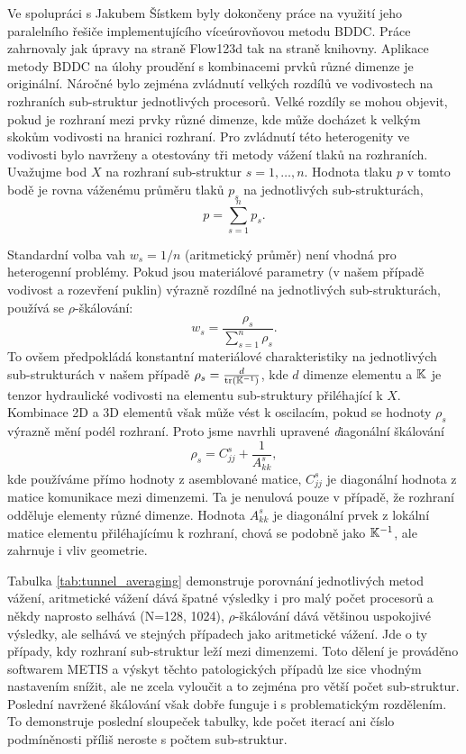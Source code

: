 Ve spolupráci s Jakubem Šístkem byly dokončeny práce na využití jeho 
paralelního řešiče implementujícího víceúrovňovou metodu BDDC. Práce zahrnovaly 
jak úpravy na straně Flow123d tak na straně knihovny. Aplikace metody BDDC na 
úlohy proudění s kombinacemi prvků různé dimenze je originální. Náročné bylo 
zejména zvládnutí velkých rozdílů ve vodivostech na rozhraních sub-struktur 
jednotlivých procesorů. Velké rozdíly se mohou objevit, pokud je rozhraní mezi 
prvky různé dimenze, kde může docházet k velkým skokům vodivosti na hranici 
rozhraní. Pro zvládnutí této heterogenity ve vodivosti bylo navrženy a 
otestovány tři metody vážení tlaků na rozhraních. Uvažujme bod $X$ na rozhraní 
sub-struktur $s=1,\dots,n$. Hodnota tlaku $p$ v tomto bodě je rovna váženému 
průměru tlaků $p_s$ na jednotlivých sub-strukturách, 
\[
    p = \sum_{s=1}^n p_s. 
\]

Standardní volba vah $w_s=1/n$ (aritmetický průměr) není vhodná pro heterogenní 
problémy. Pokud jsou materiálové parametry (v našem případě vodivost a 
rozevření puklin) výrazně rozdílné na jednotlivých sub-strukturách, používá se 
$\rho$-škálování:
\[
    w_s=\frac{\rho_s}{\sum_{s=1}^n \rho_s}.
\]
To ovšem předpokládá konstantní materiálové charakteristiky na jednotlivých 
sub-strukturách v našem případě $\rho_s=\frac{d}{\text{tr}({\mathbb{K}}^{-1})}$, 
kde $d$ dimenze elementu a ${\mathbb{K}}$ je tenzor 
hydraulické vodivosti na elementu sub-struktury přiléhající k $X$. Kombinace 2D 
a 3D elementů však může vést k oscilacím, pokud se 
hodnoty $\rho_s$ výrazně mění podél rozhraní. Proto jsme navrhli upravené 
{\emph diagonální škálování}
\[
    \rho_s=C^s_{jj} + \frac{1}{A^s_{kk}},
\]
kde používáme přímo hodnoty z 
asemblované matice, $C^s_{jj}$ je diagonální hodnota z matice komunikace mezi 
dimenzemi. Ta je nenulová pouze v případě, že rozhraní odděluje elementy různé 
dimenze. Hodnota $A^s_{kk}$ je diagonální prvek z lokální matice elementu 
přiléhajícímu k rozhraní, chová se podobně jako ${\mathbb{K}}^{-1}$, ale zahrnuje i 
vliv geometrie. 




Tabulka \ref{tab:tunnel_averaging} demonstruje porovnání 
jednotlivých metod vážení, aritmetické vážení dává špatné výsledky i pro malý 
počet procesorů a někdy naprosto selhává (N=128, 1024), $\rho$-škálování dává 
většinou uspokojivé výsledky, ale selhává ve stejných případech jako aritmetické 
vážení. Jde o ty případy, kdy rozhraní sub-struktur leží 
mezi dimenzemi. Toto dělení je prováděno softwarem METIS a výskyt těchto 
patologických případů lze sice vhodným nastavením snížit, ale ne zcela vyloučit 
a to zejména pro větší počet sub-struktur. Poslední navržené škálování  však 
dobře funguje i s problematickým rozdělením. To demonstruje poslední sloupeček 
tabulky, kde
počet iterací ani číslo podmíněnosti příliš neroste s počtem sub-struktur.

